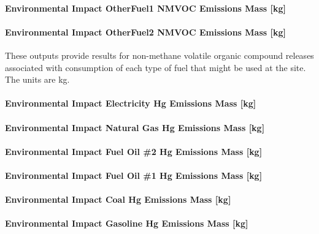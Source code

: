 \paragraph{Environmental Impact OtherFuel1 NMVOC Emissions Mass {[}kg{]}}\label{environmental-impact-otherfuel1-nmvoc-emissions-mass-kg}

\paragraph{Environmental Impact OtherFuel2 NMVOC Emissions Mass {[}kg{]}}\label{environmental-impact-otherfuel2-nmvoc-emissions-mass-kg}

These outputs provide results for non-methane volatile organic compound releases associated with consumption of each type of fuel that might be used at the site.~ The units are kg.

\paragraph{Environmental Impact Electricity Hg Emissions Mass {[}kg{]}}\label{environmental-impact-electricity-hg-emissions-mass-kg}

\paragraph{Environmental Impact Natural Gas Hg Emissions Mass {[}kg{]}}\label{environmental-impact-natural-gas-hg-emissions-mass-kg}

\paragraph{Environmental Impact Fuel Oil \#2 Hg Emissions Mass {[}kg{]}}\label{environmental-impact-fuel-oil-2-hg-emissions-mass-kg}

\paragraph{Environmental Impact Fuel Oil \#1 Hg Emissions Mass {[}kg{]}}\label{environmental-impact-fuel-oil-1-hg-emissions-mass-kg}

\paragraph{Environmental Impact Coal Hg Emissions Mass {[}kg{]}}\label{environmental-impact-coal-hg-emissions-mass-kg}

\paragraph{Environmental Impact Gasoline Hg Emissions Mass {[}kg{]}}\label{environmental-impact-gasoline-hg-emissions-mass-kg}

